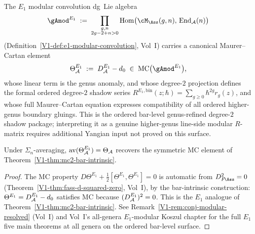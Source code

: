 \begin{theorem}
The $E_1$ modular convolution dg~Lie algebra
\[
{\gAmod}^{E_1}
\;:=\;
\prod_{\substack{g,n \\ 2g-2+n>0}}
\operatorname{Hom}\bigl(
\cM_{\Ass}(g,n),\,\operatorname{End}_\cA(n)
\bigr)
\]
\textup{(}Definition~\textup{\ref*{V1-def:e1-modular-convolution}},
Vol~I\textup{)}
carries a canonical Maurer--Cartan element
\[
\Theta_\cA^{E_1}
\;:=\;
D_\cA^{E_1} - d_0
\;\in\;
\MC\bigl({\gAmod}^{E_1}\bigr),
\]
whose linear term is the genus anomaly, and whose degree-$2$
projection defines the formal ordered degree-$2$ shadow series
$R^{E_1,\mathrm{bin}}(z;\hbar)=\sum_{g\ge 0}\hbar^{2g}r_g(z)$, and
whose full
Maurer--Cartan equation expresses compatibility of all ordered
higher-genus boundary gluings. This is the ordered bar-level
genus-refined degree-$2$ shadow package; interpreting it as a genuine
higher-genus line-side modular $R$-matrix requires additional Yangian
input not proved on this surface.

Under $\Sigma_n$-averaging\textup{,}
$\operatorname{av}(\Theta_{\mathcal{A}}^{E_1}) = \Theta_{\mathcal{A}}$
recovers the symmetric MC element of
Theorem~\textup{\ref*{V1-thm:mc2-bar-intrinsic}}.
\end{theorem}

\begin{proof}
The MC property $D\Theta^{E_1} + \tfrac12[\Theta^{E_1},\Theta^{E_1}]
= 0$ is automatic from $D_{F\!\Ass}^2 = 0$
(Theorem~\ref*{V1-thm:fass-d-squared-zero}, Vol~I), by the bar-intrinsic
construction: $\Theta^{E_1} = D^{E_1}_{\mathcal{A}} - d_0$ satisfies MC
because $(D^{E_1}_{\mathcal{A}})^2 = 0$. This is the $E_1$ analogue of
Theorem~\ref*{V1-thm:mc2-bar-intrinsic}.
See Remark~\ref*{V1-rem:conj-modular-resolved} (Vol~I) and
Vol~I's all-genera $E_1$-modular Koszul chapter for the full $E_1$ five
main theorems at all genera on the ordered bar-level surface.
\end{proof}

